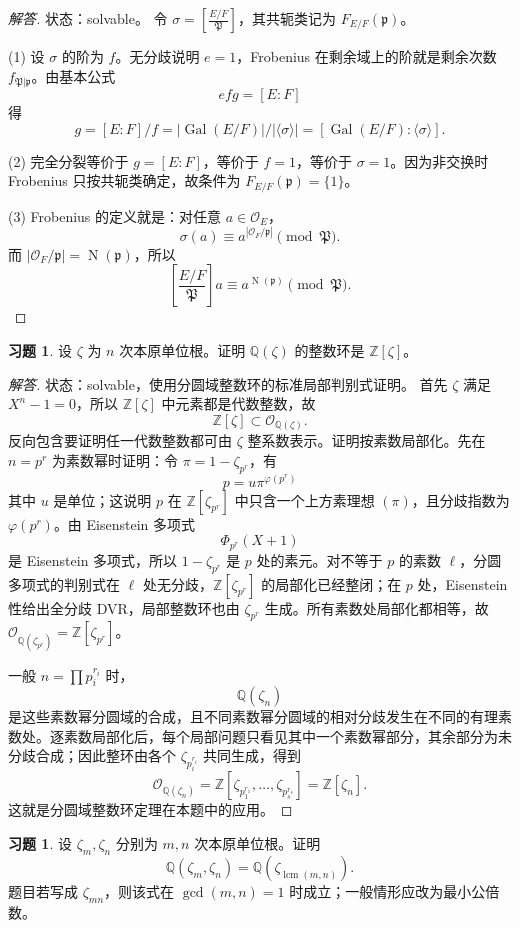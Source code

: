 \documentclass[11pt,a4paper,openany]{ctexbook}
\numberwithin{equation}{chapter}
\newcommand{\Q}{\mathbb{Q}}
\newcommand{\Z}{\mathbb{Z}}
\newcommand{\OF}{\mathcal{O}_F}
\newcommand{\Gal}{\operatorname{Gal}}
\newcommand{\Nm}{\operatorname{N}}
\theoremstyle{plain}
\theoremstyle{definition}
\newtheorem{exercise}[theorem]{习题}
\theoremstyle{remark}
\begin{document}
\begin{proof}[解答]
状态：solvable。
令 $\sigma=\left[\frac{E/F}{\mathfrak P}\right]$，其共轭类记为 $F_{E/F}(\mathfrak p)$。

(1) 设 $\sigma$ 的阶为 $f$。无分歧说明 $e=1$，Frobenius 在剩余域上的阶就是剩余次数 $f_{\mathfrak P|\mathfrak p}$。由基本公式
\[
efg=[E:F]
\]
得
\[
g=[E:F]/f=|\Gal(E/F)|/|\langle\sigma\rangle|
=[\Gal(E/F):\langle\sigma\rangle].
\]

(2) 完全分裂等价于 $g=[E:F]$，等价于 $f=1$，等价于 $\sigma=1$。因为非交换时 Frobenius 只按共轭类确定，故条件为 $F_{E/F}(\mathfrak p)=\{1\}$。

(3) Frobenius 的定义就是：对任意 $a\in\mathcal O_E$，
\[
\sigma(a)\equiv a^{|\OF/\mathfrak p|}\pmod{\mathfrak P}.
\]
而 $|\OF/\mathfrak p|=\Nm(\mathfrak p)$，所以
\[
\left[\frac{E/F}{\mathfrak P}\right]a\equiv a^{\Nm(\mathfrak p)}\pmod{\mathfrak P}.
\]
\end{proof}

\begin{exercise}
设 $\zeta$ 为 $n$ 次本原单位根。证明 $\Q(\zeta)$ 的整数环是 $\Z[\zeta]$。
\end{exercise}

\begin{proof}[解答]
状态：solvable，使用分圆域整数环的标准局部判别式证明。
首先 $\zeta$ 满足 $X^n-1=0$，所以 $\Z[\zeta]$ 中元素都是代数整数，故
\[
\Z[\zeta]\subset\mathcal O_{\Q(\zeta)}.
\]
反向包含要证明任一代数整数都可由 $\zeta$ 整系数表示。证明按素数局部化。先在 $n=p^r$ 为素数幂时证明：令 $\pi=1-\zeta_{p^r}$，有
\[
p=u\pi^{\varphi(p^r)}
\]
其中 $u$ 是单位；这说明 $p$ 在 $\Z[\zeta_{p^r}]$ 中只含一个上方素理想 $(\pi)$，且分歧指数为 $\varphi(p^r)$。由 Eisenstein 多项式
\[
\Phi_{p^r}(X+1)
\]
是 Eisenstein 多项式，所以 $1-\zeta_{p^r}$ 是 $p$ 处的素元。对不等于 $p$ 的素数
$\ell$，分圆多项式的判别式在 $\ell$ 处无分歧，$\Z[\zeta_{p^r}]$ 的局部化已经整闭；在
$p$ 处，Eisenstein 性给出全分歧 DVR，局部整数环也由 $\zeta_{p^r}$ 生成。所有素数处局部化都相等，故
$\mathcal O_{\Q(\zeta_{p^r})}=\Z[\zeta_{p^r}]$。

一般 $n=\prod p_i^{r_i}$ 时，
\[
\Q(\zeta_n)
\]
是这些素数幂分圆域的合成，且不同素数幂分圆域的相对分歧发生在不同的有理素数处。逐素数局部化后，每个局部问题只看见其中一个素数幂部分，其余部分为未分歧合成；因此整环由各个
$\zeta_{p_i^{r_i}}$ 共同生成，得到
\[
\mathcal O_{\Q(\zeta_n)}=\Z[\zeta_{p_1^{r_1}},\dots,\zeta_{p_s^{r_s}}]
=\Z[\zeta_n].
\]
这就是分圆域整数环定理在本题中的应用。
\end{proof}

\begin{exercise}
设 $\zeta_m,\zeta_n$ 分别为 $m,n$ 次本原单位根。证明
\[
\Q(\zeta_m,\zeta_n)=\Q(\zeta_{\operatorname{lcm}(m,n)}).
\]
题目若写成 $\zeta_{mn}$，则该式在 $\gcd(m,n)=1$ 时成立；一般情形应改为最小公倍数。
\end{exercise}
\end{document}

